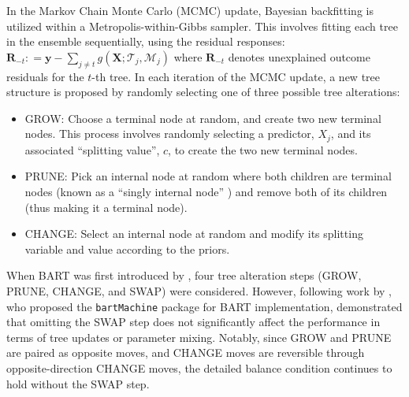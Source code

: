 In the Markov Chain Monte Carlo (MCMC) update, Bayesian backfitting \citep{hastie2000bayesian} is utilized within a Metropolis-within-Gibbs sampler. This involves fitting each tree in the ensemble sequentially, using the residual responses: $\mathbf{R}_{-t} : = \mathbf{y} - \sum_{j \neq t} g(\boldsymbol{X}; \mathcal{T}_j, \mathcal{M}_j)$ where $\mathbf{R}_{-t}$ denotes unexplained outcome residuals for the $t$-th tree. In each iteration of the MCMC update, a new tree structure is proposed by randomly selecting one of three possible tree alterations:
\begin{itemize}
\item[] GROW: Choose a terminal node at random, and create two new terminal nodes. This process involves randomly selecting a predictor, $X_j$, and its associated ``splitting value'', $c$, to create the two new terminal nodes.
\item[] PRUNE: Pick an internal node at random where both children are terminal nodes (known as a ``singly internal node'' \citep{kapelner2013bartmachine}) and remove both of its children (thus making it a terminal node).
\item[] CHANGE: Select an internal node at random and modify its splitting variable and value according to the priors.
\end{itemize}
When BART was first introduced by \citet{chipman2010bart}, four tree alteration steps (GROW, PRUNE, CHANGE, and SWAP) were considered. However, following work by \citet{kapelner2013bartmachine}, who proposed the \verb|bartMachine| package for BART implementation, demonstrated that omitting the SWAP step does not significantly affect the performance in terms of tree updates or parameter mixing. Notably, since GROW and PRUNE are paired as opposite moves, and CHANGE moves are reversible through opposite-direction CHANGE moves, the detailed balance condition continues to hold without the SWAP step.
